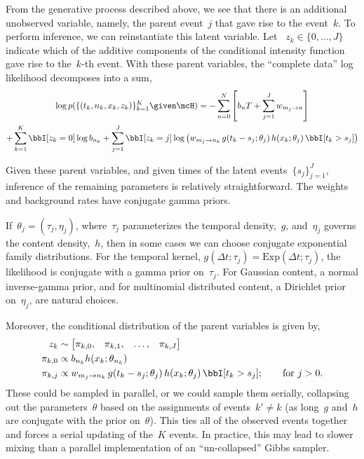 From the generative process described above, we see that there is an
additional unobserved variable, namely, the parent event~$j$ that gave
rise to the event~$k$.  To perform inference, we can reinstantiate
this latent variable. Let ~$z_k \in \{0, \ldots, J\}$ indicate which
of the additive components of the conditional intensity function gave
rise to the~$k$-th event. With these parent variables, the
``complete data'' log likelihood decomposes into a sum,
\begin{multline}
  \log p(\{(t_k, n_k, x_k, z_k)\}_{k=1}^K \given \mcH) =
  -\sum_{n=0}^N \left[ b_n T + \sum_{j=1}^J w_{m_j \to n} \right] \\
  + \sum_{k=1}^K \bbI[z_k=0] \log b_{n_k} 
  + \sum_{j=1}^J \bbI[z_k=j] \log \left(w_{m_j \to n_k} \, g(t_k-s_j; \theta_j) \, h(x_k; \theta_j) \, \bbI[t_k > s_j] \right)
\end{multline}

Given these parent variables, and given times of the latent
events~$\{s_j\}_{j=1}^J$, inference of the remaining parameters is
relatively straightforward. The weights and background rates have
conjugate gamma priors.

If~$\theta_j = (\tau_j, \eta_j)$, where~$\tau_j$
parameterizes the temporal density,~$g$, and~$\eta_j$ governs
the content density,~$h$, then in some cases we can choose conjugate
exponential family distributions. For the temporal kernel,
$g(\Delta t; \tau_j) = \mathrm{Exp}(\Delta t; \tau_j)$,
the likelihood is conjugate with a gamma prior on~$\tau_j$.
For Gaussian content, a normal inverse-gamma prior, and for
multinomial distributed content, a Dirichlet prior on~$\eta_j$,
are natural choices.

Moreover, the conditional distribution of the parent variables is given by,
\begin{align}
  z_k &\sim
  \begin{bmatrix}
        \pi_{k,0}, & \pi_{k,1}, & \ldots, &\pi_{k,J}
  \end{bmatrix}  \\
  \pi_{k,0} &\propto b_{n_k} h(x_k; \theta_{n_k}) \\
  \pi_{k,j} &\propto w_{m_j \to n_k} \, g(t_k - s_j; \theta_j) \, h(x_k ; \theta_j) \, \bbI[t_k > s_j]; \qquad \text{for }j>0.
\end{align}
These could be sampled in parallel, or we could sample them
serially, collapsing out the parameters~$\theta$ based on
the assignments of events~$k' \neq k$ (as long~$g$ and~$h$ are conjugate
with the prior on~$\theta$). This ties all of the observed
events together and forces a serial updating of the~$K$ events.
In practice, this may lead to slower mixing than a parallel
implementation of an ``un-collapsed'' Gibbs sampler. 

